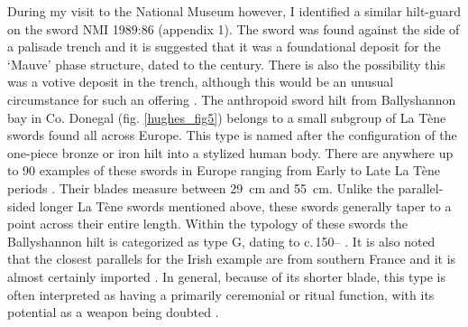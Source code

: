 During my visit to the National Museum however, 
I identified a similar hilt-guard on the sword NMI 1989:86 (appendix 1). 
The sword was found against the side of a palisade trench and it is suggested that it was a foundational deposit for the ‘Mauve’ phase structure, 
dated to the  century\AD \parencite[89]{Johnston2007}.
There is also the possibility this was a votive deposit in the trench, although this would be an unusual circumstance for such an offering \parencite[89]{Johnston2007}.
The anthropoid sword hilt from Ballyshannon bay in Co. Donegal (fig. \ref{hughes_fig5}) belongs to a small subgroup of La Tène swords found all across Europe. 
This type is named after the configuration of the one-piece bronze or iron hilt into a stylized human body. 
There are anywhere up to \num{90} examples of these swords in Europe ranging from Early to Late La Tène periods \parencite[193]{OBrien2009}. 
Their blades measure between \SI{29}{\cm} and \SI{55}{\cm}. 
Unlike the parallel-sided longer La Tène swords mentioned above, these swords generally taper to a point across their entire length. 
Within the typology of these swords the Ballyshannon hilt is categorized as type G, dating to c.\,150\BC –  \parencite[193]{OBrien2009}. 
It is also noted that the closest parallels for the Irish example are from southern France and it is almost certainly imported 
\parencites[193]{OBrien2009}[143]{Raftery1994}[25]{CahillWilson2014}. 
In general, because of its shorter blade, this type is often interpreted as having a primarily ceremonial or ritual function, 
with its potential as a weapon being doubted \parencites[69]{Pleiner1993}[160]{Lejars2007}.

